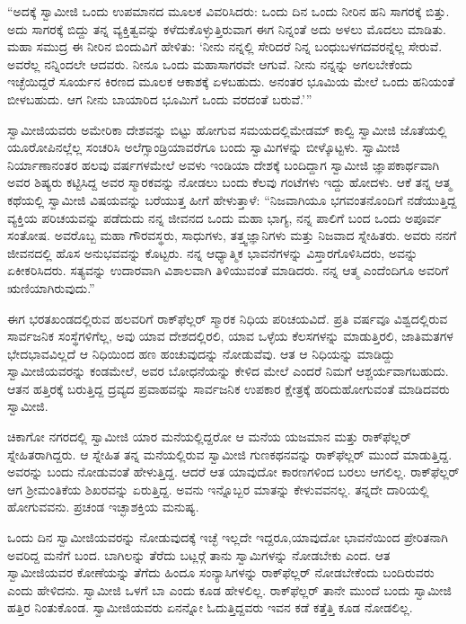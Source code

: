 “ಅದಕ್ಕೆ ಸ್ವಾಮೀಜಿ ಒಂದು ಉಪಮಾನದ ಮೂಲಕ ವಿವರಿಸಿದರು: ಒಂದು ದಿನ ಒಂದು ನೀರಿನ ಹನಿ ಸಾಗರಕ್ಕೆ ಬಿತ್ತು. ಅದು ಸಾಗರಕ್ಕೆ ಬಿದ್ದು ತನ್ನ ವ್ಯಕ್ತಿತ್ವವನ್ನು ಕಳೆದುಕೊಳ್ಳುತ್ತಿರುವಾಗ ಈಗ ನಿನ್ನಂತೆ ಅದು ಅಳಲು ಮೊದಲು ಮಾಡಿತು. ಮಹಾ ಸಮುದ್ರ ಈ ನೀರಿನ ಬಿಂದುವಿಗೆ ಹೇಳಿತು: ‘ನೀನು ನನ್ನಲ್ಲಿ ಸೇರಿದರೆ ನಿನ್ನ ಬಂಧುಬಳಗದವರನ್ನೆಲ್ಲ ಸೇರುವೆ. ಅವರೆಲ್ಲ ನನ್ನಿಂದಲೇ‌ ಆದವರು. ನೀನೂ ಒಂದು ಮಹಾಸಾಗರವೇ ಆಗುವೆ. ನೀನು ನನ್ನನ್ನು ಅಗಲಬೇಕೆಂದು ಇಚ್ಛೆಯಿದ್ದರೆ ಸೂರ್ಯನ ಕಿರಣದ ಮೂಲಕ ಆಕಾಶಕ್ಕೆ ಏಳಬಹುದು. ಅನಂತರ ಭೂಮಿಯ ಮೇಲೆ ಒಂದು ಹನಿಯಂತೆ ಬೀಳಬಹುದು. ಆಗ ನೀನು ಬಾಯಾರಿದ ಭೂಮಿಗೆ ಒಂದು ವರದಂತೆ ಬರುವೆ.’” 

 ಸ್ವಾಮೀಜಿಯವರು ಅಮೇರಿಕಾ ದೇಶವನ್ನು ಬಿಟ್ಟು ಹೋಗುವ ಸಮಯದಲ್ಲಿ\break ಮೇಡಮ್ ಕಾಲ್ವಿ ಸ್ವಾಮೀಜಿ ಜೊತೆಯಲ್ಲಿ ಯೂರೋಪಿನಲ್ಲೆಲ್ಲ ಸಂಚರಿಸಿ ಅಲೆಗ್ಸಾಂಡ್ರಿಯಾವರೆಗೂ ಬಂದು ಸ್ವಾಮಿಗಳನ್ನು ಬೀಳ್ಕೊಟ್ಟಳು. ಸ್ವಾಮೀಜಿ ನಿರ್ಯಾಣಾನಂತರ ಹಲವು ವರ್ಷಗಳಮೇಲೆ ಅವಳು ಇಂಡಿಯಾ ದೇಶಕ್ಕೆ ಬಂದಿದ್ದಾಗ ಸ್ವಾಮೀಜಿ ಜ್ಞಾಪಕಾರ್ಥವಾಗಿ ಅವರ ಶಿಷ್ಯರು ಕಟ್ಟಿಸಿದ್ದ ಅವರ ಸ್ಮಾರಕವನ್ನು ನೋಡಲು ಬಂದು ಕೆಲವು ಗಂಟೆಗಳು ಇದ್ದು ಹೋದಳು. ಆಕೆ ತನ್ನ ಆತ್ಮ ಕಥೆಯಲ್ಲಿ ಸ್ವಾಮೀಜಿ ವಿಷಯವನ್ನು ಬರೆಯುತ್ತ ಹೀಗೆ ಹೇಳುತ್ತಾಳೆ: “ನಿಜವಾಗಿಯೂ ಭಗವಂತನೊಂದಿಗೆ ನಡೆಯುತ್ತಿದ್ದ ವ್ಯಕ್ತಿಯ ಪರಿಚಯವನ್ನು ಪಡೆದುದು ನನ್ನ ಜೀವನದ ಒಂದು ಮಹಾ ಭಾಗ್ಯ, ನನ್ನ ಪಾಲಿಗೆ ಬಂದ ಒಂದು ಅಪೂರ್ವ ಸಂತೋಷ. ಅವರೊಬ್ಬ ಮಹಾ ಗೌರವಸ್ಥರು, ಸಾಧುಗಳು, ತತ್ತ್ವಜ್ಞಾನಿಗಳು ಮತ್ತು ನಿಜವಾದ ಸ್ನೇಹಿತರು. ಅವರು ನನಗೆ ಜೀವನದಲ್ಲಿ ಹೊಸ ಅನುಭವವನ್ನು ಕೊಟ್ಟರು. ನನ್ನ ಆಧ್ಯಾತ್ಮಿಕ ಭಾವನೆಗಳನ್ನು ವಿಸ್ತಾರಗೊಳಿಸಿದರು, ಅವನ್ನು ಏಕೀಕರಿಸಿದರು. ಸತ್ಯವನ್ನು ಉದಾರವಾಗಿ ವಿಶಾಲವಾಗಿ ತಿಳಿಯುವಂತೆ ಮಾಡಿದರು. ನನ್ನ ಆತ್ಮ ಎಂದೆಂದಿಗೂ ಅವರಿಗೆ ಋಣಿಯಾಗಿರುವುದು.” 

 ಈಗ ಭರತಖಂಡದಲ್ಲಿರುವ ಹಲವರಿಗೆ ರಾಕ್‍ಫೆಲ್ಲರ್ ಸ್ಮಾರಕ ನಿಧಿಯ ಪರಿಚಯವಿದೆ. ಪ್ರತಿ ವರ್ಷವೂ ವಿಶ್ವದಲ್ಲಿರುವ ಸಾರ್ವಜನಿಕ ಸಂಸ್ಥೆಗಳಿಗೆಲ್ಲ, ಅವು ಯಾವ ದೇಶದಲ್ಲಿರಲಿ, ಯಾವ ಒಳ್ಳೆಯ ಕೆಲಸಗಳನ್ನು ಮಾಡುತ್ತಿರಲಿ, ಜಾತಿಮತಗಳ ಭೇದಭಾವವಿಲ್ಲದೆ ಆ ನಿಧಿಯಿಂದ ಹಣ ಹಂಚುವುದನ್ನು ನೋಡುವೆವು. ಆತ ಆ ನಿಧಿಯನ್ನು ಮಾಡಿದ್ದು ಸ್ವಾಮೀಜಿಯವರನ್ನು ಕಂಡಮೇಲೆ, ಅವರ ಬೋಧನೆಯನ್ನು ಕೇಳಿದ ಮೇಲೆ ಎಂದರೆ ನಿಮಗೆ ಆಶ್ಚರ್ಯವಾಗಬಹುದು. ಆತನ ಹತ್ತಿರಕ್ಕೆ ಬರುತ್ತಿದ್ದ ದ್ರವ್ಯದ ಪ್ರವಾಹವನ್ನು ಸಾರ್ವಜನಿಕ ಉಪಕಾರ ಕ್ಷೇತ್ರಕ್ಕೆ ಹರಿದುಹೋಗುವಂತೆ ಮಾಡಿದವರು ಸ್ವಾಮೀಜಿ. 

\vskip 3pt

 ಚಿಕಾಗೋ ನಗರದಲ್ಲಿ ಸ್ವಾಮೀಜಿ ಯಾರ ಮನೆಯಲ್ಲಿದ್ದರೋ ಆ ಮನೆಯ ಯಜಮಾನ ಮತ್ತು ರಾಕ್‍ಫೆಲ್ಲರ್ ಸ್ನೇಹಿತರಾಗಿದ್ದರು. ಆ ಸ್ನೇಹಿತ ತನ್ನ ಮನೆಯಲ್ಲಿರುವ ಸ್ವಾಮೀಜಿ ಗುಣಕಥನವನ್ನು ರಾಕ್‍ಫೆಲ್ಲರ್ ಮುಂದೆ ಮಾಡುತ್ತಿದ್ದ. ಅವರನ್ನು ಬಂದು ನೋಡುವಂತೆ ಹೇಳುತ್ತಿದ್ದ. ಆದರೆ ಆತ ಯಾವುದೋ ಕಾರಣಗಳಿಂದ ಬರಲು ಆಗಲಿಲ್ಲ. ರಾಕ್‍ಫೆಲ್ಲರ್ ಆಗ ಶ‍್ರೀಮಂತಿಕೆಯ ಶಿಖರವನ್ನು ಏರುತ್ತಿದ್ದ. ಅವನು ಇನ್ನೊಬ್ಬರ ಮಾತನ್ನು ಕೇಳುವವನಲ್ಲ. ತನ್ನದೇ ದಾರಿಯಲ್ಲಿ ಹೋಗುವವನು. ಪ್ರಚಂಡ ಇಚ್ಛಾಶಕ್ತಿಯ ಮನುಷ್ಯ. 

\vskip 3pt

 ಒಂದು ದಿನ ಸ್ವಾಮೀಜಿಯವರನ್ನು ನೋಡುವುದಕ್ಕೆ ಇಚ್ಛೆ ಇಲ್ಲದೇ ಇದ್ದರೂ,\break ಯಾವುದೋ ಭಾವನೆಯಿಂದ ಪ್ರೇರಿತನಾಗಿ ಅವರಿದ್ದ ಮನೆಗೆ ಬಂದ. ಬಾಗಿಲನ್ನು ತೆರೆದು ಬಟ್ಲರ್‍ಗೆ ತಾನು ಸ್ವಾಮಿಗಳನ್ನು ನೋಡಬೇಕು ಎಂದ. ಆತ ಸ್ವಾಮೀಜಿಯವರ ಕೋಣೆಯನ್ನು ತೆಗೆದು ಹಿಂದೂ ಸಂನ್ಯಾಸಿಗಳನ್ನು ರಾಕ್‍ಫೆಲ್ಲರ್ ನೋಡಬೇಕೆಂದು ಬಂದಿರುವರು ಎಂದು ಹೇಳಿದನು. ಸ್ವಾಮೀಜಿ ಒಳಗೆ ಬಾ ಎಂದು ಕೂಡ ಹೇಳಲಿಲ್ಲ. ರಾಕ್‍ಫೆಲ್ಲರ್ ತಾನೇ ಮುಂದೆ ಬಂದು ಸ್ವಾಮೀಜಿ ಹತ್ತಿರ ನಿಂತುಕೊಂಡ. ಸ್ವಾಮೀಜಿಯವರು ಏನನ್ನೋ ಓದುತ್ತಿದ್ದವರು ಇವನ ಕಡೆ ಕತ್ತೆತ್ತಿ ಕೂಡ ನೋಡಲಿಲ್ಲ. 

